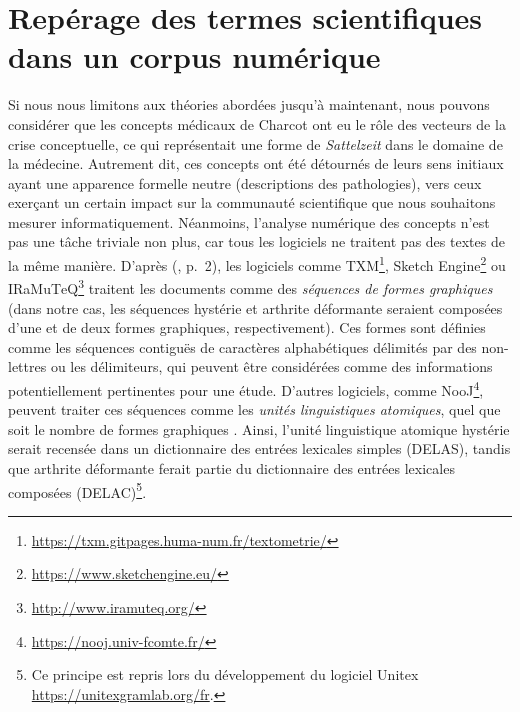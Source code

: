 \section{Repérage des termes scientifiques dans un corpus numérique}
\label{termes}
Si nous nous limitons aux théories abordées jusqu'à maintenant, nous pouvons considérer que les concepts médicaux de Charcot ont eu le rôle des vecteurs de la crise conceptuelle, ce qui représentait une forme de \textit{Sattelzeit} dans le domaine de la médecine. Autrement dit, ces concepts ont été détournés de leurs sens initiaux ayant une apparence formelle neutre (descriptions des pathologies), vers ceux exerçant un certain impact sur la communauté scientifique que nous souhaitons mesurer informatiquement. Néanmoins, l'analyse numérique des concepts n'est pas une tâche triviale non plus, car tous les logiciels ne traitent pas des textes de la même manière. D'après \citeauthor{silberztein2022linguistic} (\citeyear{silberztein2022linguistic}, p.~2), les logiciels comme \textsc{TXM}\footnote{\url{https://txm.gitpages.huma-num.fr/textometrie/}}, Sketch Engine\footnote{\url{https://www.sketchengine.eu/}} ou \textsc{IR}a\textsc{M}u\textsc{T}e\textsc{Q}\footnote{\url{http://www.iramuteq.org/}} traitent les documents comme des \textit{séquences de formes graphiques} (dans notre cas, les séquences \og{}hystérie\fg{} et \og{}arthrite déformante\fg{} seraient composées d'une et de deux formes graphiques, respectivement). Ces formes sont définies comme les séquences contiguës de caractères alphabétiques délimités par des non-lettres ou les délimiteurs, qui peuvent être considérées comme des informations potentiellement  pertinentes pour une étude. D'autres logiciels, comme \textsc{N}oo\textsc{J}\footnote{\url{https://nooj.univ-fcomte.fr/}}, peuvent traiter ces séquences comme les \textit{unités linguistiques atomiques}, quel que soit le nombre de formes graphiques \citep[pp.~2-3]{silberztein2022linguistic}. Ainsi, l'unité linguistique atomique \og{}hystérie\fg{} serait recensée dans un dictionnaire des entrées lexicales simples (\textsc{DELAS}), tandis que \og{}arthrite déformante\fg{} ferait partie du dictionnaire des entrées lexicales composées (\textsc{DELAC})\footnote{Ce principe est repris lors du développement du logiciel Unitex \url{https://unitexgramlab.org/fr}.}.

